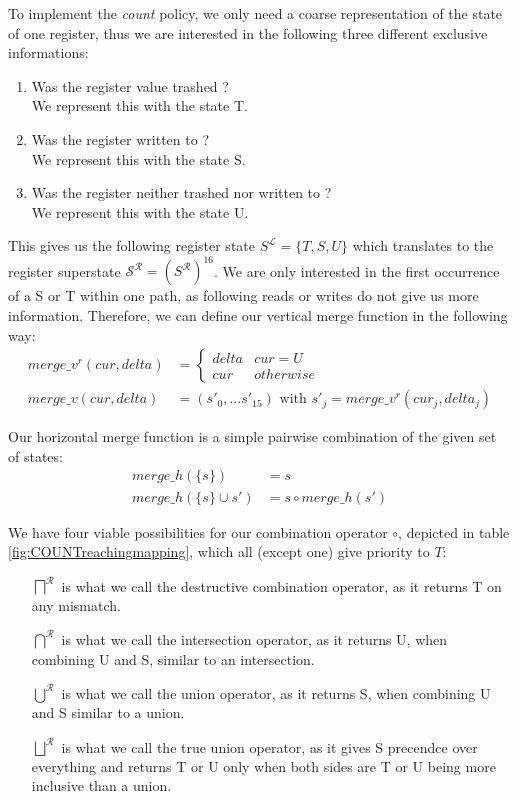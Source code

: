 To implement the \emph{count} policy, we only need a coarse representation of the state of one register, thus we are interested in the following three different exclusive informations:
\begin{enumerate}
\item Was the register value trashed ? \\ We represent this with the state T.
\item Was the register written to ? \\ We represent this with the state S.
\item Was the register neither trashed nor written to ? \\ We represent this with the state U.
\end{enumerate}
This gives us the following register state $S^\mathcal{L} = \{ T, S, U \}$ which translates to the register superstate $\mathcal{S}^\mathcal{R} = (S^\mathcal{R})^{16}$.
We are only interested in the first occurrence of a S or T within one path, as following reads or writes do not give us more information.
Therefore, we can define our vertical merge function in the following way:
\begin{align}
merge\_v^{r} (cur, delta) &= \left\{
  \begin{array}{lr}
     delta & cur = U \\
     cur & otherwise
  \end{array}
\right. \\
merge\_v (cur, delta) &= (s'_0, ... s'_15) \text { with } s'_j = merge\_v^{r}(cur_j, delta_j)
\end{align}

Our horizontal merge function is a simple pairwise combination of the given set of states:
\begin{align}
merge\_h(\{s\}) &= s\\
merge\_h(\{s\} \cup s') &= s \circ merge\_h(s')
\end{align}

We have four viable possibilities for our combination operator $\circ$, depicted in table \ref{fig:COUNTreachingmapping}, which all (except one) give priority to $T$:
\begin{itemize}
\item [$\bigsqcap^{\mathcal{R}}$] is what we call the destructive combination operator, as it returns T on any mismatch.
\item [$\bigcap^{\mathcal{R}}$] is what we call the intersection operator, as it returns U, when combining U and S, similar to an intersection.
\item [$\bigcup^{\mathcal{R}}$] is what we call the union operator, as it returns S, when combining U and S similar to a union.
\item [$\bigsqcup^{\mathcal{R}}$] is what we call the true union operator, as it gives S precendce over everything and returns T or U only when both sides are T or
U being more inclusive than a union.
\end{itemize}

